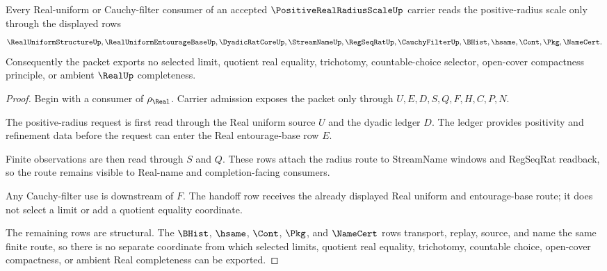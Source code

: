 \begin{theorem}
\label{thm:positive-real-radius-scale-entourage-handoff}
Every Real-uniform or Cauchy-filter consumer of an accepted $\PositiveRealRadiusScaleUp$ carrier reads the positive-radius scale only through the displayed rows
$$
\RealUniformStructureUp,\RealUniformEntourageBaseUp,\DyadicRatCoreUp,\StreamNameUp,\RegSeqRatUp,\CauchyFilterUp,\BHist,\hsame,\Cont,\Pkg,\NameCert .
$$
Consequently the packet exports no selected limit, quotient real equality, trichotomy, countable-choice selector, open-cover compactness principle, or ambient $\RealUp$ completeness.
\end{theorem}
\begin{proof}
Begin with a consumer of $\rho_{\Real}$. Carrier admission exposes the packet only through $U,E,D,S,Q,F,H,C,P,N$.

The positive-radius request is first read through the Real uniform source $U$ and the dyadic ledger $D$. The ledger provides positivity and refinement data before the request can enter the Real entourage-base row $E$.

Finite observations are then read through $S$ and $Q$. These rows attach the radius route to StreamName windows and RegSeqRat readback, so the route remains visible to Real-name and completion-facing consumers.

Any Cauchy-filter use is downstream of $F$. The handoff row receives the already displayed Real uniform and entourage-base route; it does not select a limit or add a quotient equality coordinate.

The remaining rows are structural. The $\BHist$, $\hsame$, $\Cont$, $\Pkg$, and $\NameCert$ rows transport, replay, source, and name the same finite route, so there is no separate coordinate from which selected limits, quotient real equality, trichotomy, countable choice, open-cover compactness, or ambient Real completeness can be exported.
\end{proof}


